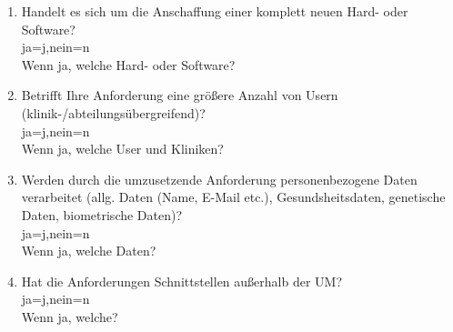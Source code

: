 \begin{Form}
\begin{enumerate}
	\item Handelt es sich um die Anschaffung einer komplett neuen Hard- oder Software? \\ 
	\ChoiceMenu[radio, radiosymbol=6 default=n, width=0.5cm, name=soha]{} {ja=j,nein=n} \\
	Wenn ja, welche Hard- oder Software? \\
	\TextField[multiline, name=jsoja,width=0.9\textwidth,  height=2cm, value={}]{}
	
	\item Betrifft Ihre Anforderung eine größere Anzahl von Usern (klinik-/abteilungsübergreifend)? \\ \ChoiceMenu[radio, radiosymbol=6 default=n, width=0.5cm, name=user]{} {ja=j,nein=n} \\
	Wenn ja, welche User und Kliniken? \\
	\TextField[multiline, name=juser,width=0.9\textwidth,  height=2cm, value={}]{}
	
	\item Werden durch die umzusetzende Anforderung personenbezogene Daten verarbeitet (allg. Daten (Name, E-Mail etc.), Gesundsheitsdaten, genetische Daten, biometrische Daten)? \\ 
	\ChoiceMenu[radio, radiosymbol=6 default=n, width=0.5cm, name=persodata]{} {ja=j,nein=n} \\
	Wenn ja, welche Daten? \\
	\TextField[multiline, name=jpersodata,width=0.9\textwidth,  height=2cm, value={}]{}
	\newpage
	\item Hat die Anforderungen Schnittstellen außerhalb der UM? \\ 
	\ChoiceMenu[radio, radiosymbol=6 default=n, width=0.5cm, name=outum]{} {ja=j,nein=n} \\
	Wenn ja, welche? \\
	\TextField[multiline, name=joutum,width=0.9\textwidth,  height=2cm, value={}]{}

  \end{enumerate}
\end{Form}